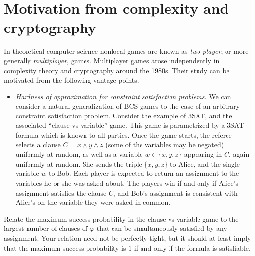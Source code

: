 \section{Motivation from complexity and cryptography}


In theoretical computer science nonlocal games are known as \emph{two-player}, or more generally \emph{multiplayer}, games. Multiplayer games arose independently in complexity theory and cryptography around the 1980s. 
Their study can be motivated from the following vantage points. 
\begin{itemize}
\item \emph{Hardness of approximation for constraint satisfaction problems.} We can consider a natural generalization of BCS games to the case of an arbitrary constraint satisfaction problem. Consider the example of $3$SAT, and the associated ``clause-vs-variable'' game. This game is parametrized by a $3$SAT formula which is known to all parties. Once the game starts, the referee selects a clause $C = x \wedge y \wedge z$ (some of the variables may be negated) uniformly at random, as well as a variable $w\in\{x,y,z\}$ appearing in $C$, again uniformly at random. She sends the triple $\{x,y,z\}$ to Alice, and the single variable $w$ to Bob. Each player is expected to return an assignment to the variables he or she was asked about. The players win if and only if Alice's assignment satisfies the clause $C$, and Bob's assignment is consistent with Alice's on the variable they were asked in common.\\
\end{itemize}

\begin{exercise}
Relate the maximum success probability in the clause-vs-variable game to the largest number of clauses of $\varphi$ that can be simultaneously satisfied by any assignment. Your relation need not be perfectly tight, but it should at least imply that the maximum success probability is $1$ if and only if the formula is satisfiable. 
\end{exercise}

